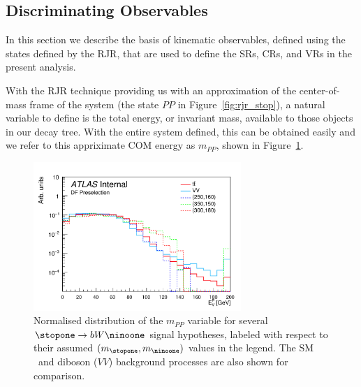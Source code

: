 \FloatBarrier
%
%

\subsection{Discriminating Observables}
\label{sec:stop_variables}

In this section we describe the basis of kinematic observables, defined using the states defined
by the RJR, that are used to define the SRs, CRs, and VRs in the present analysis.

With the RJR technique providing us with an approximation of the center-of-mass frame of the
\stop system (the state $PP$ in Figure~\ref{fig:rjr_stop}), a natural variable to define is the
total energy, or invariant mass, available to those objects in our decay tree.
With the entire system defined, this can be obtained easily and we refer to this
appriximate COM energy as $m_{PP}$, shown in Figure~\ref{fig:rjr_mpp}.

\begin{figure}[!htb]
    \begin{center}
        \includegraphics[width=0.7\textwidth]{figures/search_stop2l/strategy/comp_plots/dfpresel_MDR}
        \caption{
            Normalised distribution of the $m_{PP}$ variable for several $\stopone \rightarrow b W \ninoone$
            signal hypotheses, labeled with respect to their assumed $(m_{\stopone}, m_{\ninoone})$ values in the
            legend.
            The SM \ttbar~and diboson ($VV$) background processes are also shown for comparison.
        }
        \label{fig:rjr_mpp}
    \end{center}
\end{figure}

